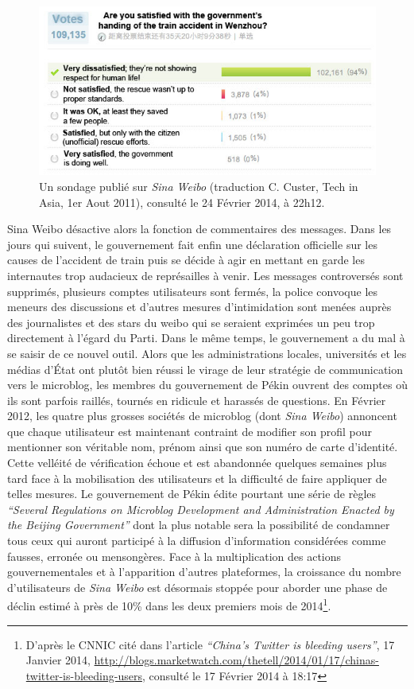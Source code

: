 \begin{figure}[ht]
    \centering
    \includegraphics[scale=0.7]{figures/chap1/train.jpg}
    \caption[Sondage Weibo concernant l'accident de train de Wenzhou]{Un sondage publié sur \textit{Sina Weibo} (traduction C. Custer, Tech in Asia, 1er Aout 2011), consulté le 24 Février 2014, à 22h12.}
    \label{fig:poll_weibo}
\end{figure}

Sina Weibo désactive alors la fonction de commentaires des messages. Dans les jours qui suivent, le gouvernement fait enfin une déclaration officielle sur les causes de l’accident de train puis se décide à agir en mettant en garde les internautes trop audacieux de représailles à venir. Les messages controversés sont supprimés, plusieurs comptes utilisateurs sont fermés, la police convoque les meneurs des discussions et d’autres mesures d’intimidation sont menées auprès des journalistes et des stars du weibo qui se seraient exprimées un peu trop directement à l’égard du Parti. Dans le même temps, le gouvernement a du mal à se saisir de ce nouvel outil. Alors que les administrations locales, universités et les médias d’État ont plutôt bien réussi le virage de leur stratégie de communication vers le microblog, les membres du gouvernement de Pékin ouvrent des comptes où ils sont parfois raillés, tournés en ridicule et harassés de questions. En Février 2012, les quatre plus grosses sociétés de microblog (dont \textit{Sina Weibo}) annoncent que chaque utilisateur est maintenant contraint de modifier son profil pour mentionner son véritable nom, prénom ainsi que son numéro de carte d’identité. Cette velléité de vérification échoue et est abandonnée quelques semaines plus tard face à la mobilisation des utilisateurs et la difficulté de faire appliquer de telles mesures. Le gouvernement de Pékin édite pourtant une série de règles \textit{“Several Regulations on Microblog Development and Administration Enacted by the Beijing Government”} dont la plus notable sera la possibilité de condamner tous ceux qui auront participé à la diffusion d’information considérées comme fausses, erronée ou mensongères. Face à la multiplication des actions gouvernementales et à l’apparition d’autres plateformes, la croissance du nombre d’utilisateurs de \textit{Sina Weibo} est désormais stoppée pour aborder une phase de déclin estimé à près de 10\% dans les deux premiers mois de 2014\footnote{D’après le CNNIC cité dans l’article  \textit{“China’s Twitter is bleeding users”}, 17 Janvier 2014, \url{http://blogs.marketwatch.com/thetell/2014/01/17/chinas-twitter-is-bleeding-users}, consulté le 17 Février 2014 à 18:17}. 

